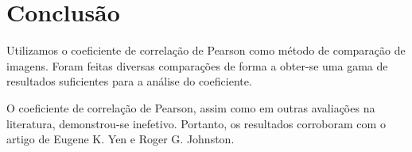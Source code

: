 \documentclass[10pt,a4paper]{article}
\begin{document}
\newpage
\section{Conclusão}
Utilizamos o coeficiente de correlação de Pearson  
 como método de comparação de imagens. Foram feitas diversas
 comparações de forma a obter-se uma gama de resultados suficientes
 para a análise do coeficiente.

O coeficiente de correlação de Pearson, assim como em outras
avaliações na literatura, demonstrou-se inefetivo. Portanto, os
resultados corroboram com o artigo de Eugene K. Yen e
Roger G. Johnston.



\begin{small}
  
\end{small}
\end{document}
